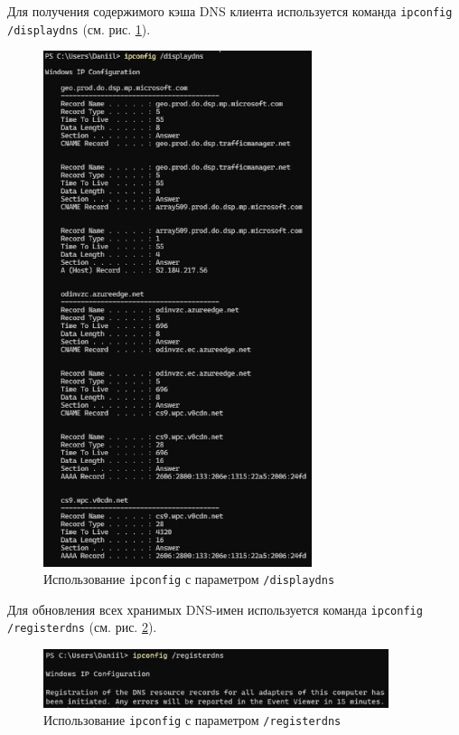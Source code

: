 \documentclass[a4paper, 14pt]{extarticle}
\begin{document}
Для получения содержимого кэша DNS клиента используется команда
\texttt{ipconfig /displaydns} (см. рис. \ref{fig:ipconfig-displaydns}).

\begin{figure}[H]
  \centering
  \includegraphics[width=0.7\textwidth]{images/ipconfig/displaydns.png}
  \caption{Использование \texttt{ipconfig} с параметром \texttt{/displaydns}}
  \label{fig:ipconfig-displaydns}
\end{figure}

Для обновления всех хранимых DNS-имен используется команда \texttt{ipconfig
  /registerdns} (см. рис. \ref{fig:ipconfig-registerdns}).

\begin{figure}[H]
  \centering
  \includegraphics[width=0.9\textwidth]{images/ipconfig/registerdns.png}
  \caption{Использование \texttt{ipconfig} с параметром \texttt{/registerdns}}
  \label{fig:ipconfig-registerdns}
\end{figure}
\end{document}
